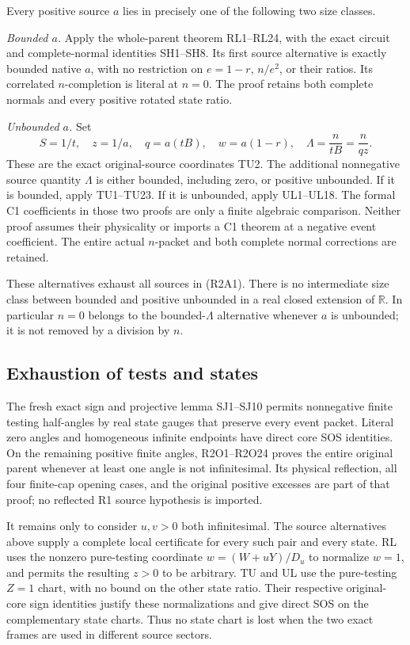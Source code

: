 Every positive source \(a\) lies in precisely one of the following
two size classes.

\emph{Bounded \(a\).}
Apply the whole-parent theorem RL1--RL24, with the exact circuit
and complete-normal identities SH1--SH8.
Its first source alternative is exactly bounded native \(a\),
with no restriction on \(e=1-r\), \(n/e^2\), or their ratios.
Its correlated \(n\)-completion is literal at \(n=0\).
The proof retains both complete normals and every positive
rotated state ratio.

\emph{Unbounded \(a\).}
Set
\[
 S=1/t,\quad z=1/a,\quad q=a(tB),\quad
 w=a(1-r),\quad \Lambda=\frac{n}{tB}=\frac{n}{qz}.
                                                               \tag{R2A3}
\]
These are the exact original-source coordinates TU2.
The additional nonnegative source quantity \(\Lambda\) is either
bounded, including zero, or positive unbounded.
If it is bounded, apply TU1--TU23.
If it is unbounded, apply UL1--UL18.
The formal C1 coefficients in those two proofs are only a finite
algebraic comparison.  Neither proof assumes their physicality
or imports a C1 theorem at a negative event coefficient.
The entire actual \(n\)-packet and both complete normal
corrections are retained.

These alternatives exhaust all sources in (R2A1).
There is no intermediate size class between bounded and
positive unbounded in a real closed extension of \(\mathbb R\).
In particular \(n=0\) belongs to the bounded-\(\Lambda\)
alternative whenever \(a\) is unbounded; it is not removed by
a division by \(n\).

\subsection{Exhaustion of tests and states}

The fresh exact sign and projective lemma SJ1--SJ10 permits
nonnegative finite testing half-angles by real state gauges
that preserve every event packet.  Literal zero angles and
homogeneous infinite endpoints have direct core SOS identities.
On the remaining positive finite angles, R2O1--R2O24 proves
the entire original parent whenever at least one angle is
not infinitesimal.  Its physical reflection, all four
finite-cap opening cases, and the original positive excesses
are part of that proof; no reflected R1 source hypothesis
is imported.

It remains only to consider \(u,v>0\) both infinitesimal.
The source alternatives above supply a complete local certificate
for every such pair and every state.  RL uses the nonzero
pure-testing coordinate \(w=(W+uY)/D_u\) to normalize
\(w=1\), and permits the resulting \(z>0\) to be arbitrary.
TU and UL use the pure-testing \(Z=1\) chart, with no bound on
the other state ratio.  Their respective original-core sign
identities justify these normalizations and give direct SOS
on the complementary state charts.  Thus no state chart is
lost when the two exact frames are used in different source
sectors.

